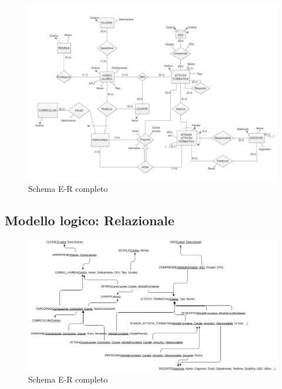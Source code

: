 \documentclass[a4paper,12pt,italian,towside]{article}
\begin{document}
\begin{figure} [!h] %
	\caption{Schema E-R completo}
	\begin{center}
		\includegraphics[scale=0.455,angle=90]{../Schemas/ER_diagram_restructured.jpg} %
	\end{center}
\end{figure}

\newpage
\subsection{Modello logico: Relazionale}

\begin{figure} [!h] %
	\caption{Schema E-R completo}
	\begin{center}
		\includegraphics[scale=0.455,angle=90]{../Schemas/relational_model.jpg} %
	\end{center}
\end{figure}
\end{document}
